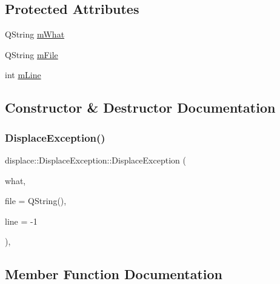 \subsection*{Protected Attributes}
\begin{DoxyCompactItemize}
\item 
Q\+String \mbox{\hyperlink{classdisplace_1_1_displace_exception_a4c14af77840132ba34faf2a49948e045}{m\+What}}
\item 
Q\+String \mbox{\hyperlink{classdisplace_1_1_displace_exception_ac4caf1d5e929009ea9bc7ad7bdb96e32}{m\+File}}
\item 
int \mbox{\hyperlink{classdisplace_1_1_displace_exception_a9660f64aa8208609f628baa5681a569c}{m\+Line}}
\end{DoxyCompactItemize}


\subsection{Constructor \& Destructor Documentation}
\mbox{\label{classdisplace_1_1_displace_exception_aa6724fc24720385ef5e68119dc53dc3c}} 
\subsubsection{\texorpdfstring{DisplaceException()}{DisplaceException()}}
{\footnotesize\ttfamily displace\+::\+Displace\+Exception\+::\+Displace\+Exception (\begin{DoxyParamCaption}\item[{Q\+String}]{what,  }\item[{Q\+String}]{file = {\ttfamily QString()},  }\item[{int}]{line = {\ttfamily -\/1} }\end{DoxyParamCaption})\hspace{0.3cm}{\ttfamily [inline]}, {\ttfamily [explicit]}}



\subsection{Member Function Documentation}
\mbox{\label{classdisplace_1_1_displace_exception_a1d302252417f1a8946e61f22056cf745}} 
